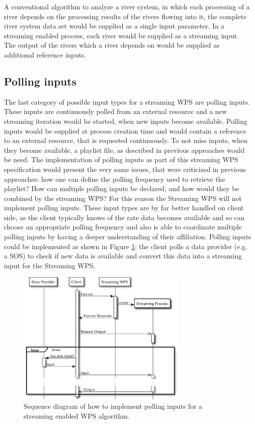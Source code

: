 			A conventional algorithm to analyze a river system, in which each processing of a river depends on the processing results of the rivers flowing into it, the complete river system data set would be supplied as a single input parameter. In a streaming enabled process, each river would be supplied as a streaming input. The output of the rivers which a river depends on would be supplied as additional reference inputs.
		\subsection{Polling inputs}
			\label{sec:stream:input:polling}
			The last category of possible input types for a streaming \ac{WPS} are polling inputs. These inputs are continuously polled from an external resource and a new streaming iteration would be started, when new inputs become available. Polling inputs would be supplied at process creation time and would contain a reference to an external resource, that is requested continuously. To not miss inputs, when they become available, a playlist file, as described in previous approaches \citep{foerster2012live} would be need. The implementation of polling inputs as part of this streaming \ac{WPS} specification would present the very same issues, that were criticized in previous approaches: how one can define the polling frequency used to retrieve the playlist? How can multiple polling inputs be declared, and how would they be combined by the streaming \ac{WPS}? For this reason the Streaming \ac{WPS} will not implement polling inputs. These input types are by far better handled on client side, as the client typically knows of the rate data becomes available and so can choose an appropriate polling frequency and also is able to coordinate multiple polling inputs by having a deeper understanding of their affiliation. Polling inputs could be implemented as shown in Figure \ref{fig:sd:polling}: the client polls a data provider (e.g. a \ac{SOS}) to check if new data is available and convert this data into a streaming input for the Streaming \ac{WPS}.
			\begin{figure}[!htb]
				\centering
				\includegraphics[width=0.73521126760563382\textwidth]{figures/sequence-diagramm-polling.pdf}
				\caption{\label{fig:sd:polling}Sequence diagram of how to implement polling inputs for a streaming enabled WPS algorithm.}
			\end{figure}


